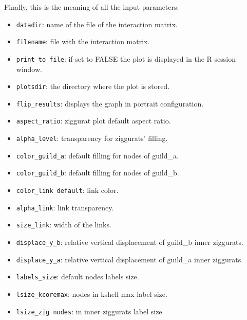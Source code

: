 \documentclass[12pt]{article}
\begin{document}
\noindent Finally, this is the meaning of all the input parameters:
\small
\begin{itemize}

\item \texttt{datadir}:  name of the file of the interaction matrix.

\item \texttt{filename}: file with the interaction matrix.

\item \texttt{print\_to\_file}: if set to FALSE the plot is displayed in the R session window.

\item \texttt{plotsdir}:  the directory where the plot is stored.

\item \texttt{flip\_results}: displays the graph in portrait configuration.

\item \texttt{aspect\_ratio}: ziggurat plot default aspect ratio.

\item \texttt{alpha\_level}: transparency for ziggurats' filling.

\item \texttt{color\_guild\_a}: default filling for nodes of guild\_a.

\item \texttt{color\_guild\_b}: default filling for nodes of guild\_b.

\item \texttt{color\_link default}: link color.

\item \texttt{alpha\_link}: link transparency.

\item \texttt{size\_link}: width of the links.
\item \texttt{displace\_y\_b}: relative vertical displacement of guild\_b inner ziggurats.

\item \texttt{displace\_y\_a}: relative vertical displacement of guild\_a inner ziggurats.

\item \texttt{labels\_size}: default nodes labels size.

\item \texttt{lsize\_kcoremax}: nodes in kshell max label size.

\item \texttt{lsize\_zig nodes}: in inner ziggurats label size.


\end{itemize}
\end{document}

